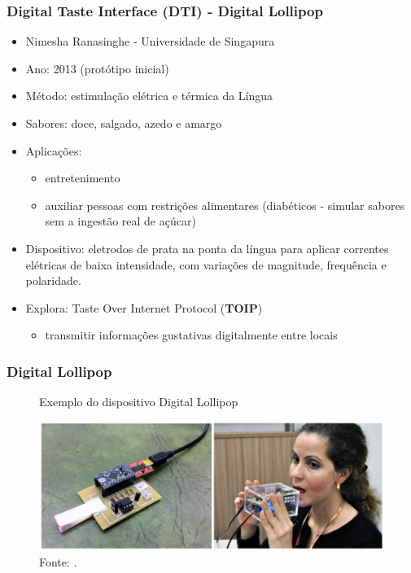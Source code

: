 \documentclass{beamer}
\begin{document}
\begin{frame}
  \frametitle{Digital Taste Interface (DTI) - Digital Lollipop}
  \begin{itemize}
    \item Nimesha Ranasinghe - Universidade de Singapura
    \item Ano: 2013 (protótipo inicial)
    \item Método: estimulação elétrica  e térmica da Língua
    \item Sabores: doce, salgado, azedo e amargo
    \item Aplicações:
    \begin{itemize}
      \item entretenimento
      \item auxiliar pessoas com restrições alimentares (diabéticos - simular sabores sem a ingestão real de açúcar)
    \end{itemize}
    \item Dispositivo: eletrodos de prata na ponta da língua para aplicar correntes elétricas de baixa intensidade, com variações de magnitude, frequência e polaridade.  
    \item Explora: Taste Over Internet Protocol (\textbf{TOIP})
    \begin{itemize}
      \item transmitir informações gustativas digitalmente entre locais
    \end{itemize}
  \end{itemize}
  \begin{flushright}
    \scriptsize
    \cite{ranasingheTongueMountedInterface2012}
    \cite{ranasingheVirtualTasteDigital2023}
  \end{flushright}
\end{frame}

\begin{frame}
  \frametitle{Digital Lollipop}
  \begin{figure}[h]
    \centering
    \caption{Exemplo do dispositivo Digital Lollipop}
    \vspace{-18pt}
    \includegraphics[width=1.03\textwidth]{img_DigitalLollipop.png}
    \vspace{-20pt}
    \caption*{Fonte: \cite{ranasingheDigitalLollipopStudying2016}.}
  \end{figure}
\end{frame}
\end{document}
